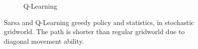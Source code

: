 \documentclass{article}
\begin{document}
\begin{figure}[h!]
\begin{subfigure}{0.45\textwidth}
    \caption{Q-Learning}
  \end{subfigure}
  \caption{Sarsa and Q-Learning greedy policy and statistics, in stochastic gridworld. The path is shorter than regular gridworld due to diagonal movement ability.}
  \label{fig:stochastic_example}
\end{figure}
\end{document}
